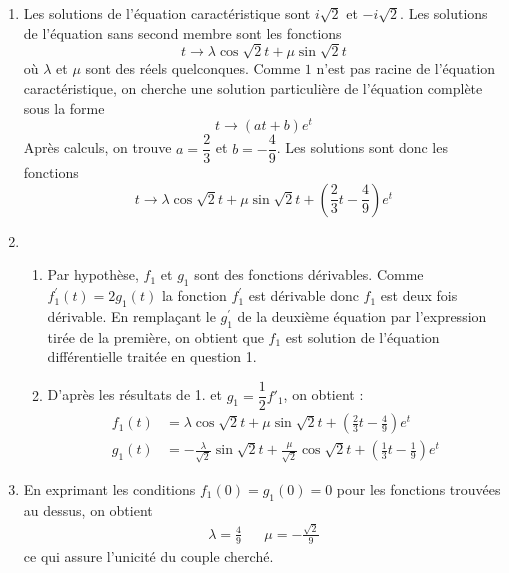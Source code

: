 \begin{enumerate}
 \item Les solutions de l'équation caractéristique sont $i\sqrt{2}$ et  $-i\sqrt{2}$.  Les solutions de l'équation sans second membre sont les fonctions
\begin{displaymath}
 t \rightarrow \lambda \cos \sqrt{2}t + \mu \sin \sqrt{2}t
\end{displaymath}
où $\lambda$ et $\mu$ sont des réels quelconques. Comme $1$ n'est pas racine de l'équation caractéristique, on cherche une solution particulière de l'équation complète sous la forme
\begin{displaymath}
 t \rightarrow (at+b)e^t
\end{displaymath}
Après calculs, on trouve $a=\dfrac{2}{3}$ et $b=-\dfrac{4}{9}$. Les solutions sont donc les fonctions
\begin{displaymath}
 t \rightarrow \lambda \cos \sqrt{2}t + \mu \sin \sqrt{2}t +(\frac{2}{3}t-\frac{4}{9})e^t
\end{displaymath}

\item \begin{enumerate}
 \item Par hypothèse, $f_1$ et $g_1$ sont des fonctions dérivables. Comme $f_1^\prime(t) = 2g_1(t)$
 la fonction $f_1^\prime$ est dérivable donc $f_1$ est deux fois dérivable. En remplaçant le $g_1^\prime$ de la deuxième équation par l'expression tirée de la première, on obtient que $f_1$ est solution de l'équation différentielle traitée en question 1.
 \item D'après les résultats de 1. et $g_1 = \dfrac{1}{2}f'_1$, on obtient :
\begin{align*}
 f_1(t) &= \lambda \cos \sqrt{2}t + \mu \sin \sqrt{2}t +(\frac{2}{3}t-\frac{4}{9})e^t \\
 g_1(t) &= -\frac{\lambda}{\sqrt{2}} \sin \sqrt{2}t + \frac{\mu}{\sqrt{2}} \cos \sqrt{2}t +(\frac{1}{3}t-\frac{1}{9})e^t
\end{align*}
\end{enumerate}
\item En exprimant les conditions $f_1(0)=g_1(0)=0$ pour les fonctions trouvées au dessus, on obtient 
\begin{align*}
 \lambda = \frac{4}{9}& & \mu =-\frac{\sqrt{2}}{9}
\end{align*}
ce qui assure l'unicité du couple cherché.
\end{enumerate}
